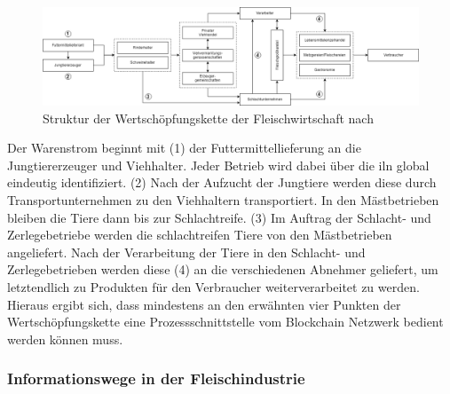 \begin{landscape}
    \begin{figure}
        \centering
        \includegraphics[width=1.0\linewidth]{pictures/structure-value-chain-meat-industry-numbered}
        \caption[Struktur der Wertschöpfungskette der Fleischwirtschaft]{Struktur der Wertschöpfungskette der Fleischwirtschaft nach \citet{Petersen2010, Voss2010, Beck2008}}
        \label{fig:structure-value-chain-meat-industry-numbered}
    \end{figure}
\end{landscape}

\noindent
Der Warenstrom beginnt mit (1) der Futtermittellieferung an die Jungtiererzeuger und Viehhalter. Jeder Betrieb wird dabei über die \ac{iln} global eindeutig identifiziert. (2) Nach der Aufzucht der Jungtiere werden diese durch Transportunternehmen zu den Viehhaltern transportiert. In den Mästbetrieben bleiben die Tiere dann bis zur Schlachtreife. (3) Im Auftrag der Schlacht- und Zerlegebetriebe werden die schlachtreifen Tiere von den Mästbetrieben angeliefert. Nach der Verarbeitung der Tiere in den Schlacht- und Zerlegebetrieben werden diese (4) an die verschiedenen Abnehmer geliefert, um letztendlich zu Produkten für den Verbraucher weiterverarbeitet zu werden. Hieraus ergibt sich, dass mindestens an den erwähnten vier Punkten der Wertschöpfungskette eine Prozessschnittstelle vom Blockchain Netzwerk bedient werden können muss.

\subsubsection{Informationswege in der Fleischindustrie}

